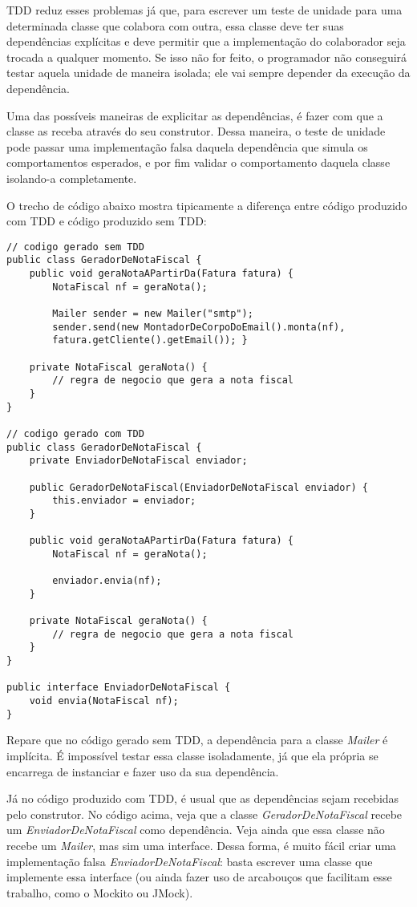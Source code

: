 TDD reduz esses problemas já que, para escrever um teste de unidade para uma
determinada classe que colabora com outra, essa classe deve ter suas
dependências explícitas e deve permitir que a implementação do colaborador seja
trocada a qualquer momento. Se isso não for feito, o programador não conseguirá
testar aquela unidade de maneira isolada; ele vai sempre depender da execução da
dependência.

Uma das possíveis maneiras de explicitar as dependências, é fazer com que a
classe as receba através do seu construtor. Dessa maneira, o teste de unidade
pode passar uma implementação falsa daquela dependência que simula os
comportamentos esperados, e por fim validar o comportamento daquela classe
isolando-a completamente.

O trecho de código abaixo mostra tipicamente a diferença entre código produzido
com TDD e código produzido sem TDD:

\begin{lstlisting}[frame=trbl]
// codigo gerado sem TDD
public class GeradorDeNotaFiscal {
	public void geraNotaAPartirDa(Fatura fatura) {
		NotaFiscal nf = geraNota(); 
		
		Mailer sender = new Mailer("smtp");
		sender.send(new MontadorDeCorpoDoEmail().monta(nf),
		fatura.getCliente().getEmail()); }
	
	private NotaFiscal geraNota() {
		// regra de negocio que gera a nota fiscal
	}
}

// codigo gerado com TDD
public class GeradorDeNotaFiscal {
	private EnviadorDeNotaFiscal enviador;
	
	public GeradorDeNotaFiscal(EnviadorDeNotaFiscal enviador) {
		this.enviador = enviador;
	}
	
	public void geraNotaAPartirDa(Fatura fatura) {
		NotaFiscal nf = geraNota(); 
		
		enviador.envia(nf);
	}
	
	private NotaFiscal geraNota() {
		// regra de negocio que gera a nota fiscal
	}
}

public interface EnviadorDeNotaFiscal {
	void envia(NotaFiscal nf);
}
\end{lstlisting}

Repare que no código gerado sem TDD, a dependência para a classe \textit{Mailer}
é implícita. É impossível testar essa classe isoladamente, já que ela própria se
encarrega de instanciar e fazer uso da sua dependência. 

Já no código produzido com TDD, é usual que as dependências sejam recebidas pelo
construtor. No código acima, veja que a classe \textit{GeradorDeNotaFiscal}
recebe um \textit{EnviadorDeNotaFiscal} como dependência. Veja ainda que essa
classe não recebe um \textit{Mailer}, mas sim uma interface. Dessa forma, é
muito fácil criar uma implementação falsa \textit{EnviadorDeNotaFiscal}: basta
escrever uma classe que implemente essa interface (ou ainda fazer uso de
arcabouços que facilitam esse trabalho, como o Mockito ou JMock).

